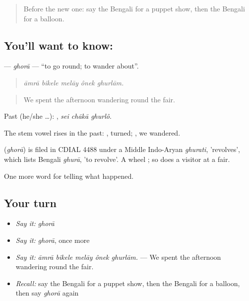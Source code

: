\begin{quote}
Before the new one: say the Bengali for a puppet show, then the Bengali for a balloon.
\end{quote}

\subsection*{You'll want to know: }
\textbf{} — \emph{ghorā} — \textquotedblleft{}to go round; to wander about\textquotedblright{}.

\begin{quote}
    
\end{quote}

\begin{quote}
\emph{āmrā bikele melāy ônek ghurlām.}
\end{quote}

\begin{quote}
We spent the afternoon wandering round the fair.
\end{quote}

Past (he/she …):   , \emph{sei chākā ghurlô}.

The stem vowel rises in the past: , turned; , we wandered.

\begin{cousinweb}
\textbf{} (\emph{ghorā}) is filed in CDIAL 4488 under a Middle Indo-Aryan \emph{ghurati}, 'revolves', which lists Bengali \emph{ghurā}, 'to revolve'. A wheel ; so does a visitor at a fair.
\end{cousinweb}

\begin{grammarlens}[title={What you've built}]
One more word for telling what happened.
\end{grammarlens}

\subsection*{Your turn}
\begin{itemize}
\raggedright
  \item \emph{Say it:} \emph{ghorā}
  \item \emph{Say it:} \emph{ghorā}, once more
  \item \emph{Say it:} \emph{āmrā bikele melāy ônek ghurlām.} — We spent the afternoon wandering round the fair.
  \item \emph{Recall:} say the Bengali for a puppet show, then the Bengali for a balloon, then say \emph{ghorā} again
\end{itemize}

